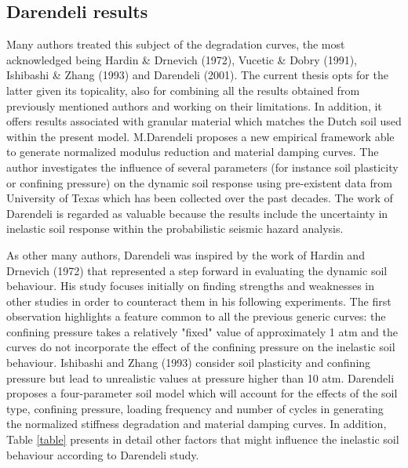 \documentclass[10pt,a4paper]{report}
\begin{document}
\subsection{Darendeli results}
Many authors treated this subject of the degradation curves, the most acknowledged being Hardin \& Drnevich (1972), Vucetic \& Dobry (1991)\cite{dobry1988dynamic}, Ishibashi \& Zhang (1993) \cite{ishibashi1993unified} and Darendeli (2001)\cite{darendeli2001development}. The current thesis opts for the latter given its topicality, also for combining all the results obtained from previously mentioned authors and working on their limitations. In addition, it offers results associated with granular material which matches the Dutch soil used within the present model.
M.Darendeli proposes a new empirical framework able to generate normalized modulus reduction and material damping curves. The author investigates the influence of several parameters (for instance soil plasticity or confining pressure) on the dynamic soil response using pre-existent data from University of Texas which has been collected over the past decades. The work of Darendeli is regarded as valuable because the results include the uncertainty in inelastic soil response within the probabilistic seismic hazard analysis.
 
As other many authors, Darendeli was inspired by the work of Hardin and Drnevich (1972) that represented a step forward in evaluating the dynamic soil behaviour. His study focuses initially on finding strengths and weaknesses in other studies in order to counteract them in his following experiments. The first observation highlights a feature common to all the previous generic curves: the confining pressure takes a relatively "fixed" value of approximately 1 atm and the curves do not incorporate the effect of the confining pressure on the inelastic soil behaviour. Ishibashi and Zhang (1993) consider soil plasticity and confining pressure but lead to unrealistic values at pressure higher than 10 atm. Darendeli proposes a four-parameter soil model which will account for the effects of the soil type, confining pressure, loading frequency and number of cycles in generating the normalized stiffness degradation and material damping curves. In addition, Table \ref{table} presents in detail other factors that might influence the inelastic soil behaviour according to Darendeli study.
\end{document}
